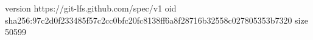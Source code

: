 version https://git-lfs.github.com/spec/v1
oid sha256:97c2d0f233485f57c2cc0bfc20fc8138ff6a8f28716b32558c027805353b7320
size 50599
